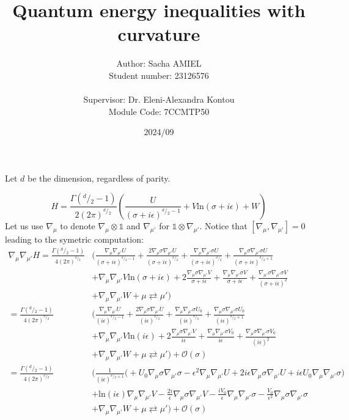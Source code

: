 \documentclass[a4paper,11pt]{article}
\title{Quantum energy inequalities with curvature}
\author{Author: Sacha AMIEL \\
Student number: 23126576\\
\\ Supervisor: Dr. Eleni-Alexandra Kontou \\ Module Code: 7CCMTP50}
\date{2024/09}
\numberwithin{equation}{section}
\theoremstyle{definition}
\newcommand{\dd}{{^d\!/\!_2}}
\begin{document}
Let $d$ be the dimension, regardless of parity.

\begin{equation}
    H=\frac{\Gamma\left(\dd -1\right)}{2 (2\pi)^\dd} \left(
    \frac{U}{(\sigma+i\epsilon)^{\dd-1}}
    +V\mathrm{ln}(\sigma+i\epsilon)
    +W\right)
\end{equation}
Let us use $\nabla_\mu$ to denote $\nabla_\mu\otimes\mathds{1}$ and $\nabla_{\mu'}$ for $\mathds{1}\otimes\nabla_{\mu'}$. Notice that $[\nabla_\mu, \nabla_{\mu'}]=0$ leading to the symetric computation:
\begin{align*}
    \nabla_\mu\nabla_{\mu'} H = \frac{\Gamma\left(\dd -1\right)}{4 (2\pi)^\dd} &\Bigg(
    \frac{\nabla_\mu \nabla_{\mu'} U}{(\sigma+i\epsilon)^{\dd-1}}
    + \frac{2 \nabla_\mu \sigma \nabla_{\mu'} U}{(\sigma+i\epsilon)^{\dd}}
    + \frac{\nabla_\mu \nabla_{\mu'} \sigma U}{(\sigma+i\epsilon)^{\dd}}
    + \frac{\nabla_\mu \sigma \nabla_{\mu'} \sigma U}{(\sigma+i\epsilon)^{\dd+1}}\\
    &+ \nabla_\mu\nabla_{\mu'} V \mathrm{ln}(\sigma+i\epsilon)
    + 2\frac{\nabla_\mu \sigma \nabla_{\mu'} V}{\sigma+i\epsilon}
    + \frac{\nabla_\mu\nabla_{\mu'}\sigma V}{\sigma + i\epsilon}
    + \frac{\nabla_{\mu'} \sigma \nabla_{\mu'} \sigma V}{(\sigma+i\epsilon)^2}\\
    &+ \nabla_\mu \nabla_{\mu'} W + \mu \rightleftarrows {\mu'}
    \Bigg)\\
    = \frac{\Gamma\left(\dd -1\right)}{4 (2\pi)^\dd} &\Bigg(
    \frac{\nabla_\mu \nabla_{\mu'} U}{(i\epsilon)^{\dd-1}}
    + \frac{2 \nabla_\mu \sigma \nabla_{\mu'} U}{(i\epsilon)^{\dd}}
    + \frac{\nabla_\mu \nabla_{\mu'} \sigma U_0}{(i\epsilon)^{\dd}}
    + \frac{\nabla_\mu \sigma \nabla_{\mu'} \sigma U_0}{(i\epsilon)^{\dd+1}}\\
    &+ \nabla_\mu\nabla_{\mu'} V \mathrm{ln}(i\epsilon)
    + 2\frac{\nabla_\mu \sigma \nabla_{\mu'} V}{i\epsilon}
    + \frac{\nabla_\mu\nabla_{\mu'}\sigma V_0}{i\epsilon}
    + \frac{\nabla_\mu \sigma \nabla_{\mu'} \sigma V_0}{(i\epsilon)^2}\\
    &+ \nabla_\mu \nabla_{\mu'} W + \mu \rightleftarrows {\mu'}
    \Bigg) + \mathcal{O}(\sigma)\\
    = \frac{\Gamma\left(\dd -1\right)}{4 (2\pi)^\dd} &\Bigg(\frac{1}{(i\epsilon)^{\dd+1}}\big(
    + U_0 \nabla_\mu \sigma \nabla_{\mu'} \sigma
    -\epsilon^2 \nabla_\mu \nabla_{\mu'} U
    + 2 i\epsilon  \nabla_\mu \sigma \nabla_{\mu'} U
    + i \epsilon U_0 \nabla_\mu \nabla_{\mu'} \sigma\big)\\
    &+ \mathrm{ln}(i\epsilon) \nabla_\mu\nabla_{\mu'} V 
    - \frac{2i}{\epsilon}\nabla_\mu \sigma \nabla_{\mu'} V
    - \frac{iV_0}{\epsilon} \nabla_\mu\nabla_{\mu'}\sigma
    - \frac{V_0}{\epsilon^2}\nabla_\mu \sigma \nabla_{\mu'} \sigma\\
    &+ \nabla_\mu \nabla_{\mu'} W + \mu \rightleftarrows {\mu'}
    \Bigg) + \mathcal{O}(\sigma)
\end{align*}
\end{document}
